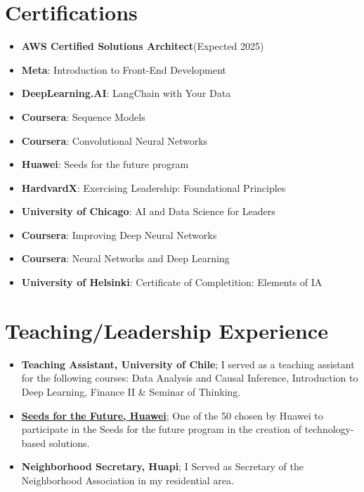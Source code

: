\documentclass[letterpaper,11pt]{article}
\newcommand{\resumeItem}[2]{
  \item\small{
    \textbf{#1}{#2 \vspace{-2pt}}
  }
}
\newcommand{\resumeSubItem}[2]{\resumeItem{#1}{#2}\vspace{-4pt}}
\newcommand{\resumeSubItemcol}[2]{\resumeItem{#1}{#2}\vspace{-8pt}}
\newcommand{\resumeSubHeadingListStart}{\begin{itemize}[leftmargin=*]}
\newcommand{\resumeSubHeadingListEnd}{\end{itemize}}
\begin{document}
\section{Certifications}
\vspace{-15pt}
  \begin{multicols}{2}
    \resumeSubHeadingListStart
    \resumeSubItemcol{AWS Certified Solutions Architect}{(Expected 2025)}
    \resumeSubItemcol{Meta}{: Introduction to Front-End Development}
    \resumeSubItemcol{DeepLearning.AI}{: LangChain with Your Data}
    \resumeSubItemcol{Coursera}{: Sequence Models}
    \resumeSubItemcol{Coursera}{: Convolutional Neural Networks}
    \resumeSubItemcol{Huawei}{: Seeds for the future program}
    \resumeSubItemcol{HardvardX}{: Exercising Leadership: Foundational Principles}
    \resumeSubItemcol{University of Chicago}{: AI and Data Science for Leaders}
    \resumeSubItemcol{Coursera}{: Improving Deep Neural Networks}
    \resumeSubItemcol{Coursera}{: Neural Networks and Deep Learning}
    \resumeSubItemcol{University of Helsinki}{: Certificate of Completition: Elements of IA}
  \resumeSubHeadingListEnd
  \end{multicols}
\section{Teaching/Leadership Experience}
 \resumeSubHeadingListStart
  \resumeSubItem
    {Teaching Assistant, University of Chile}
    {; I served as a teaching assistant for the following courses: Data Analysis and Causal Inference, Introduction to Deep Learning, Finance II \& Seminar of Thinking.}
  \resumeSubItem
    {\href{https://ingenieria.uchile.cl/noticias/188882/estudiantes-fcfm-destacaron-en-5ta-version-del-programa-huawei}{Seeds for the Future, Huawei}}
    {; One of the 50 chosen by Huawei to participate in the Seeds for the future program in the creation of technology-based solutions.}
  \resumeSubItem
    {Neighborhood Secretary, Huapi}
    {; I Served as Secretary of the Neighborhood Association in my residential area.}
  \resumeSubHeadingListEnd
\end{document}
